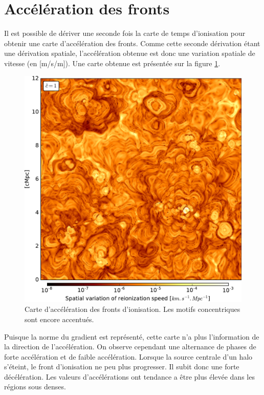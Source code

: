\section{Accélération des fronts}

Il est possible de dériver une seconde fois la carte de temps d'ionisation pour obtenir une carte d'accélération des fronts.
Comme cette seconde dérivation étant une dérivation spatiale, l'accélération obtenue est donc une variation spatiale de vitesse (en [m/s/m]).
Une carte obtenue est présentée sur la figure \ref{fig:accz}.

\begin{figure}
        \includegraphics[width=.95\linewidth]{img/04_mapreio/map_acc_c1.pdf} 
        \caption[Accélération des fronts d'ionisation]{Carte d'accélération des fronts d'ionisation.
        Les motifs concentriques sont encore accentués.
        }
 		\label{fig:accz}
\end{figure}

Puisque la norme du gradient est représenté, cette carte n'a plus l'information de la direction de l'accélération.
On observe cependant une alternance de phases de forte accélération et de faible accélération.
Lorsque la source centrale d'un halo s’éteint, le front d'ionisation ne peu plus progresser.
Il subit donc une forte décélération.
Les valeurs d'accélérations ont tendance a être plus élevée dans les régions sous denses.

